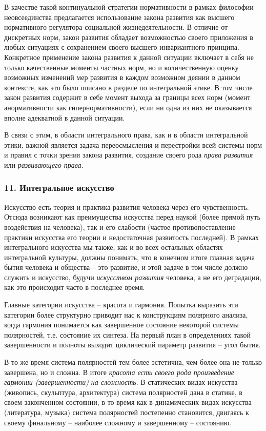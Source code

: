     В качестве такой континуальной стратегии нормативности в рамках философии неовсеединства предлагается использование закона развития как высшего нормативного регулятора социальной жизнедеятельности. В отличие от дискретных норм, закон развития обладает возможностью своего приложения в любых ситуациях с сохранением своего высшего инвариантного принципа. Конкретное применение закона развития к данной ситуации включает в себя не только качественные моменты частных норм, но и количественную оценку возможных изменений мер развития в каждом возможном деянии в данном контексте, как это было описано в разделе по интегральной этике. В том числе закон развития содержит в себе момент выхода за границы всех норм (момент анормативности как гипернормативности), если ни одна из них не оказывается вполне адекватной в данной ситуации.

    В связи с этим, в области интегрального права, как и в области интегральной этики, важной является задача переосмысления и перестройки всей системы норм и правил с точки зрения закона развития, создание своего рода \textit{права развития} или \textit{развивающего права}.

    \subsubsection*{11. Интегральное искусство}
    Искусство есть теория и практика развития человека через его чувственность. Отсюда возникают как преимущества искусства перед наукой (более прямой путь воздействия на человека), так и его слабости (частое противопоставление практики искусства его теории и недостаточная развитость последней). В рамках интегрального искусства мы также, как и во всех остальных областях интегральной культуры, должны понимать, что в конечном итоге главная задача бытия человека и общества – это развитие, и этой задаче в том числе должно служить и искусство, будучи \textit{искусством развития} человека, а не его деградации, как это происходит часто в последнее время.

    Главные категории искусства – красота и гармония. Попытка выразить эти категории более структурно приводит нас к конструкциям полярного анализа, когда гармония понимается как завершенное состояние некоторой системы полярностей, т.е. состояние их синтеза. На первый план в определениях такой завершенности и полноты выходит циклический параметр развития – угол бытия.

    В то же время система полярностей тем более эстетична, чем более она не только завершена, но и сложна. В итоге \textit{красота есть своего рода произведение гармонии (завершенности) на сложность}. В статических видах искусства (живопись, скульптура, архитектура) система полярностей дана в статике, в своем законченном состоянии, в то время как в динамических видах искусства (литература, музыка) система полярностей постепенно становится, двигаясь к своему финальному – наиболее сложному и завершенному – состоянию.

